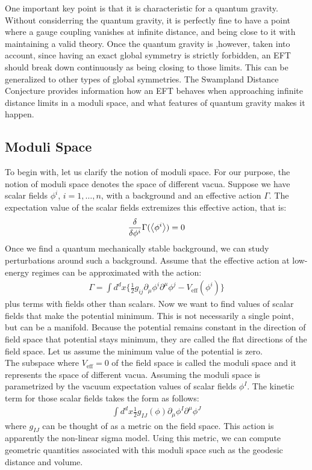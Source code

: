 \indent One important key point is that it is characteristic for a quantum gravity. Without considerring the quantum gravity, it is perfectly fine to have a point where a gauge coupling vanishes at infinite distance, and being close to it with maintaining a valid theory. Once the quantum gravity is ,however, taken into account, since having an exact global symmetry is strictly forbidden, an EFT should break down continuously as being closing to those limits. This can be generalized to other types of global symmetries. The Swampland Distance Conjecture provides information how an EFT behaves when approaching infinite distance limits in a moduli space, and what features of quantum gravity makes it happen. 
\subsection{Moduli Space}
To begin with, let us clarify the notion of moduli space. For our purpose, the notion of moduli space denotes the space of different vacua. Suppose we have scalar fields $\phi ^{i}$, $i =1,\dotso ,n$, with a background and an effective action $\Gamma$. The expectation value of the scalar fields extremizes this effective action, that is:
\begin{align}
    \fdv{\phi ^{i}} \Gamma (\expval{\phi ^{i}}) = 0
\end{align}
Once we find a quantum mechanically stable background, we can study perturbations around such a background. Assume that the effective action at low-energy regimes can be approximated with the action:
\begin{align}
    \Gamma = \int d^{d}x \lbrace \frac{1}{2} g_{ij} \partial _{\mu} \phi ^{i} \partial ^{\mu} \phi ^{j} - V_{\text{eff}} (\phi ^{i}) \rbrace
\end{align}
plus terms with fields other than scalars. Now we want to find values of scalar fields that make the potential minimum. This is not necessarily a single point, but can be a manifold. Because the potential remains constant in the direction of field space that potential stays minimum, they are called the flat directions of the field space. Let us assume the minimum value of the potential is zero. \\
\indent The subspace where $V_{\text{eff}} = 0$ of the field space is called the moduli space and it represents the space of different vacua. Assuming the moduli space is parametrized by the vacuum expectation values of scalar fields $\phi ^{I}$. The kinetic term for those scalar fields takes the form as follows:
\begin{align}
    \int d^{d}x \frac{1}{2} g_{IJ} (\phi) \partial _{\mu} \phi ^{I} \partial ^{\mu} \phi ^{J}  
\end{align}
where $g_{IJ}$ can be thought of as a metric on the field space. This action is apparently the non-linear sigma model. Using this metric, we can compute geometric quantities associated with this moduli space such as the geodesic distance and volume.

